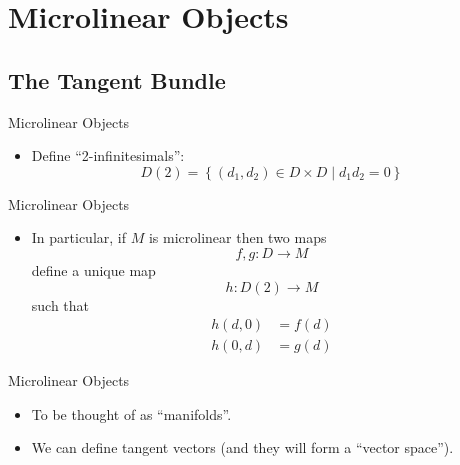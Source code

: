 \documentclass{beamer}
\begin{document}
\section{Microlinear Objects}

\subsection{The Tangent Bundle}


\begin{frame}{Microlinear Objects}
  \begin{itemize}
    \item Define ``2-infinitesimals'':
      \begin{equation*}
        D(2) =  \left\{(d_1,d_2)\in D\times D \mid d_1d_2 = 0\right\}
      \end{equation*}
  \end{itemize}
\end{frame}

\begin{frame}{Microlinear Objects}

\begin{itemize}
  \item In particular, if \( M \) is microlinear then two maps
    \begin{equation*}
      f,g:D\to M
    \end{equation*}
    define a unique map
    \begin{equation*}
      h:D(2)\to M
    \end{equation*}
    such that 
    \begin{align*}
      h(d,0) &= f(d)\\
      h(0,d) &= g(d)
    \end{align*}
\end{itemize}

\end{frame}

\begin{frame}{Microlinear Objects}

\begin{itemize}
  \item To be thought of as ``manifolds''.
  \item We can define tangent vectors (and they will form a ``vector space'').
\end{itemize}

\end{frame}
\end{document}
